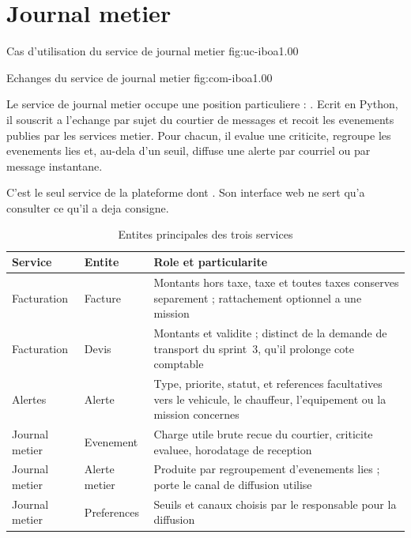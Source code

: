 \section{Journal metier}

  {Cas d'utilisation du service de journal metier}
  {fig:uc-iboa}{1.00}

  {Echanges du service de journal metier}
  {fig:com-iboa}{1.00}

Le service de journal metier occupe une position particuliere :
. Ecrit en Python, il souscrit
a l'echange par sujet du courtier de messages et recoit les evenements
publies par les services metier. Pour chacun, il evalue une criticite,
regroupe les evenements lies et, au-dela d'un seuil, diffuse une alerte
par courriel ou par message instantane.

C'est le seul service de la plateforme dont . Son interface web ne
sert qu'a consulter ce qu'il a deja consigne.

\begin{table}[H]
\centering
\caption{Entites principales des trois services}
\label{tab:entites-s5}
\small
\begin{tabularx}{\textwidth}{@{}p{2.6cm}p{3.4cm}X@{}}
\toprule
\textbf{Service} & \textbf{Entite} & \textbf{Role et particularite} \\ \midrule
Facturation & Facture & Montants hors taxe, taxe et toutes taxes
  conserves separement ; rattachement optionnel a une mission \\
Facturation & Devis & Montants et validite ; distinct de la demande de
  transport du sprint~3, qu'il prolonge cote comptable \\
Alertes & Alerte & Type, priorite, statut, et references facultatives
  vers le vehicule, le chauffeur, l'equipement ou la mission concernes \\
Journal metier & Evenement & Charge utile brute recue du courtier,
  criticite evaluee, horodatage de reception \\
Journal metier & Alerte metier & Produite par regroupement d'evenements
  lies ; porte le canal de diffusion utilise \\
Journal metier & Preferences & Seuils et canaux choisis par le
  responsable pour la diffusion \\
\bottomrule
\end{tabularx}
\end{table}


